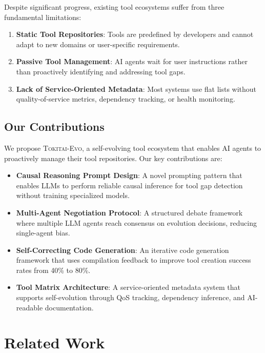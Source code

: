 \documentclass[11pt]{article}
\newcommand{\ours}{\textsc{Tokitai-Evo}\xspace}
\begin{document}
Despite significant progress, existing tool ecosystems suffer from three fundamental limitations:

\begin{enumerate}
    \item \textbf{Static Tool Repositories}: Tools are predefined by developers and cannot adapt to new domains or user-specific requirements.
    \item \textbf{Passive Tool Management}: AI agents wait for user instructions rather than proactively identifying and addressing tool gaps.
    \item \textbf{Lack of Service-Oriented Metadata}: Most systems use flat lists without quality-of-service metrics, dependency tracking, or health monitoring.
\end{enumerate}

\subsection{Our Contributions}

We propose \ours, a self-evolving tool ecosystem that enables AI agents to proactively manage their tool repositories. Our key contributions are:

\begin{itemize}
    \item \textbf{Causal Reasoning Prompt Design}: A novel prompting pattern that enables LLMs to perform reliable causal inference for tool gap detection without training specialized models.
    \item \textbf{Multi-Agent Negotiation Protocol}: A structured debate framework where multiple LLM agents reach consensus on evolution decisions, reducing single-agent bias.
    \item \textbf{Self-Correcting Code Generation}: An iterative code generation framework that uses compilation feedback to improve tool creation success rates from 40\% to 80\%.
    \item \textbf{Tool Matrix Architecture}: A service-oriented metadata system that supports self-evolution through QoS tracking, dependency inference, and AI-readable documentation.
\end{itemize}

\section{Related Work}\label{sec:related}
\end{document}
